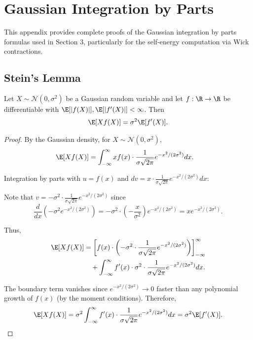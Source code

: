 
\section{Gaussian Integration by Parts}\label{app:gaussian-ibp}

This appendix provides complete proofs of the Gaussian integration by parts formulas used in Section 3, particularly for the self-energy computation via Wick contractions.

\subsection{Stein's Lemma}

\begin{lemma}\label{lem:stein-univariate}
Let $X \sim \mathcal{N}(0, \sigma^2)$ be a Gaussian random variable and let $f: \R \to \R$ be differentiable with $\E[|f(X)|], \E[|f'(X)|] < \infty$. Then
\begin{equation}\label{eq:stein-univariate}
\E[X f(X)] = \sigma^2 \E[f'(X)].
\end{equation}
\end{lemma}

\begin{proof}
By the Gaussian density, for $X \sim \mathcal{N}(0, \sigma^2)$,
\begin{align}
\E[X f(X)]
&= \int_{-\infty}^\infty x f(x) \cdot \frac{1}{\sigma\sqrt{2\pi}} e^{-x^2/(2\sigma^2)} dx.
\end{align}

Integration by parts with $u = f(x)$ and $dv = x \cdot \frac{1}{\sigma\sqrt{2\pi}} e^{-x^2/(2\sigma^2)} dx$:

Note that $v = -\sigma^2 \cdot \frac{1}{\sigma\sqrt{2\pi}} e^{-x^2/(2\sigma^2)}$ since
\[
\frac{d}{dx}\left(-\sigma^2 e^{-x^2/(2\sigma^2)}\right) = -\sigma^2 \cdot \left(-\frac{x}{\sigma^2}\right) e^{-x^2/(2\sigma^2)} = x e^{-x^2/(2\sigma^2)}.
\]

Thus,
\begin{align}
\E[X f(X)]
&= \left[f(x) \cdot \left(-\sigma^2 \cdot \frac{1}{\sigma\sqrt{2\pi}} e^{-x^2/(2\sigma^2)}\right)\right]_{-\infty}^\infty \\
&\quad + \int_{-\infty}^\infty f'(x) \cdot \sigma^2 \cdot \frac{1}{\sigma\sqrt{2\pi}} e^{-x^2/(2\sigma^2)} dx.
\end{align}

The boundary term vanishes since $e^{-x^2/(2\sigma^2)} \to 0$ faster than any polynomial growth of $f(x)$ (by the moment conditions). Therefore,
\begin{align}
\E[X f(X)] = \sigma^2 \int_{-\infty}^\infty f'(x) \cdot \frac{1}{\sigma\sqrt{2\pi}} e^{-x^2/(2\sigma^2)} dx = \sigma^2 \E[f'(X)].
\end{align}
\end{proof}

